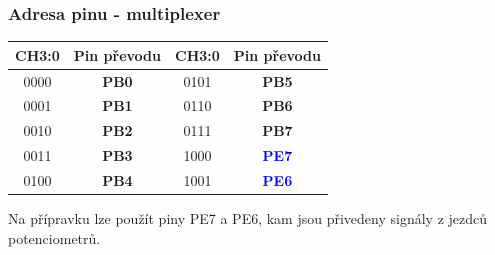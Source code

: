 	\begin{frame}
    \frametitle{Adresa pinu - multiplexer}
		
		
		\begin{center}
			\begin{tabular}{c | c || c | c}
				\textbf{CH3:0} & Pin převodu & \textbf{CH3:0} & Pin převodu \\
				\hline
				0000 & \textbf{PB0} & 0101 & \textbf{PB5} \\
				0001 & \textbf{PB1} & 0110 & \textbf{PB6} \\
				0010 & \textbf{PB2} & 0111 & \textbf{PB7} \\
				0011 & \textbf{PB3} & 1000 & \textcolor{blue}{\textbf{PE7}} \\
				0100 & \textbf{PB4} & 1001 & \textcolor{blue}{\textbf{PE6}} \\
			\end{tabular}
		\end{center}
		
		\vspace{5mm}
		Na přípravku lze použít piny PE7 a PE6, kam jsou přivedeny signály z jezdců potenciometrů.
		
	\end{frame}
	

